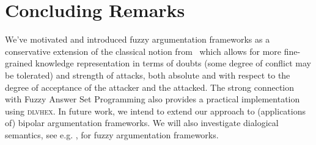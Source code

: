 \documentclass[12pt,a4paper]{article}
\begin{document}
%
%

\section{Concluding Remarks}\label{sec-conclusions}
We've motivated and introduced fuzzy argumentation frameworks as a conservative
extension of the classical notion from~\cite{dung95} which allows for
more fine-grained knowledge representation in terms of doubts (some
degree of conflict may be tolerated) and strength of attacks, both absolute and
with respect to the degree of acceptance of the attacker and the
attacked. The strong connection with Fuzzy Answer Set
Programming\cite{fasp0} also provides a practical implementation
using \textsc{dlvhex}\cite{fasp1}. In future work, we intend to extend
our approach to (applications of) bipolar argumentation 
frameworks\cite{cayrol2005,karacapilidis2001,verheij2002,amgoud2004}.
We will also investigate dialogical semantics, see e.g. \cite{jv99.1}, 
for fuzzy argumentation frameworks.

\end{document}
